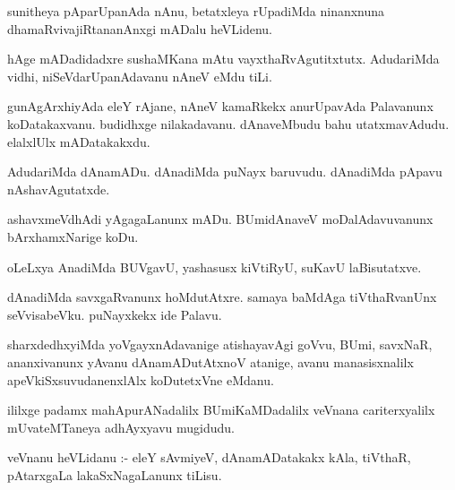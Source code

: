 \documentclass{article}
\begin{document}
\begin{mn}
sunitheya pAparUpanAda nAnu, betatxleya rUpadiMda ninanxnuna dhamaRvivajiRtananAnxgi mADalu heVLidenu.
\end{mn}

\begin{mn}
hAge mADadidadxre  sushaMKana mAtu vayxthaRvAgutitxtutx. AdudariMda vidhi, niSeVdarUpanAdavanu nAneV eMdu tiLi.
\end{mn}

\begin{mn}
gunAgArxhiyAda  eleY rAjane, nAneV kamaRkekx anurUpavAda Palavanunx koDatakaxvanu.  
budidhxge nilakadavanu.  dAnaveMbudu bahu utatxmavAdudu.  elalxlUlx mADatakakxdu.
\end{mn}

\begin{mn}
AdudariMda dAnamADu.  dAnadiMda puNayx baruvudu. dAnadiMda pApavu nAshavAgutatxde.
\end{mn}

\begin{mn}
ashavxmeVdhAdi yAgagaLanunx mADu.  BUmidAnaveV moDalAdavuvanunx bArxhamxNarige koDu.
\end{mn}

\begin{mn}
oLeLxya AnadiMda BUVgavU, yashasusx kiVtiRyU, suKavU laBisutatxve.
\end{mn}

\begin{mn}
dAnadiMda savxgaRvanunx hoMdutAtxre. samaya baMdAga  tiVthaRvanUnx seVvisabeVku.  puNayxkekx ide Palavu.
\end{mn}

\begin{mn}
sharxdedhxyiMda yoVgayxnAdavanige atishayavAgi  goVvu, BUmi, savxNaR, ananxivanunx yAvanu 
dAnamADutAtxnoV atanige,  avanu manasisxnalilx apeVkiSxsuvudanenxlAlx koDutetxVne eMdanu.
\end{mn}

\begin{mn}
ililxge padamx mahApurANadalilx BUmiKaMDadalilx veVnana cariterxyalilx mUvateMTaneya adhAyxyavu mugidudu.
\end{mn}




\begin{mn}
veVnanu heVLidanu :- eleY sAvmiyeV,  dAnamADatakakx kAla, tiVthaR, pAtarxgaLa lakaSxNagaLanunx tiLisu.
\end{mn}
\end{document}
